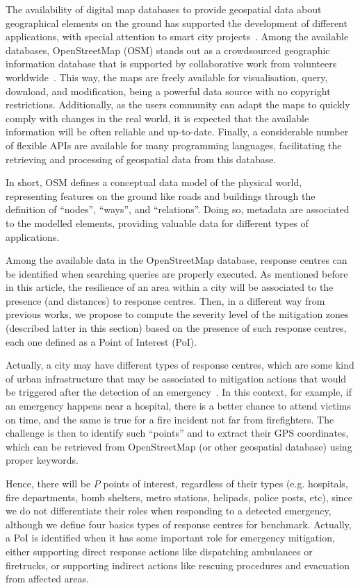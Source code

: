 \begin{refsection}
The availability of digital map databases to provide geospatial data about geographical elements on the ground has supported the development of different applications, with special attention to smart city projects~\cite{spatial2,spatial1}. Among the available databases, OpenStreetMap (OSM) stands out as a crowdsourced geographic information database that is supported by collaborative work from volunteers worldwide~\cite{openstreetmap}. This way, the maps are freely available for visualisation, query, download, and modification, being a powerful data source with no copyright restrictions. Additionally, as the users community can adapt the maps to quickly comply with changes in the real world, it is expected that the available information will be often reliable and up-to-date. Finally, a considerable number of flexible APIs are available for many programming languages, facilitating the retrieving and processing of geospatial data from this database.

In short, OSM defines a conceptual data model of the physical world, representing features on the ground like roads and buildings through the definition of ``nodes'', ``ways'', and ``relations''. Doing so, metadata are associated to the modelled elements, providing valuable data for different types of applications.

Among the available data in the OpenStreetMap database, response centres can be identified when searching queries are properly executed. As mentioned before in this article, the resilience of an area within a city will be associated to the presence (and distances) to response centres. Then, in a different way from previous works, we propose to compute the severity level of the mitigation zones (described latter in this section) based on the presence of such response centres, each one defined as a Point of Interest (PoI).

Actually, a city may have different types of response centres, which are some kind of urban infrastructure that may be associated to mitigation actions that would be triggered after the detection of an emergency~\cite{surveyEmergencies}. In this context, for example, if an emergency happens near a hospital, there is a better chance to attend victims on time, and the same is true for a fire incident not far from firefighters. The challenge is then to identify such ``points'' and to extract their GPS coordinates, which can be retrieved from OpenStreetMap (or other geospatial database) using proper keywords. 

Hence, there will be $P$ points of interest, regardless of their types (e.g. hospitals, fire departments, bomb shelters, metro stations, helipads, police posts, etc), since we do not differentiate their roles when responding to a detected emergency, although we define four basics types of response centres for benchmark. Actually, a PoI is identified when it has some important role for emergency mitigation, either supporting direct response actions like dispatching ambulances or firetrucks, or supporting indirect actions like rescuing procedures and evacuation from affected areas.


\end{refsection}

